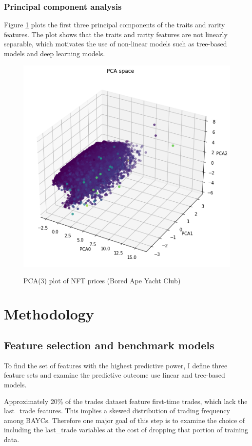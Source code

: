 \documentclass[12pt]{article}
\begin{document}
\subsubsection{Principal component analysis}
Figure \ref{fig: pca} plots the first three principal components of the traits and rarity features. The plot shows that the traits and rarity features are not linearly separable, which motivates the use of non-linear models such as tree-based models and deep learning models.   
\begin{figure}[H]
    \caption{PCA(3) plot of NFT prices (Bored Ape Yacht Club)}
    \includegraphics[width=\textwidth]{../figures/pca_1.png}
    \label{fig: pca}
\end{figure}

\section{Methodology}
\label{sec: method}
\subsection{Feature selection and benchmark models}
To find the set of features with the highest predictive power, I define three feature sets and examine the predictive outcome use linear and tree-based models.

Approximately 20\% of the trades dataset feature first-time trades, which lack the last\_trade features. This implies a skewed distribution of trading frequency among BAYCs. Therefore one major goal of this step is to examine the choice of including the last\_trade variables at the cost of dropping that portion of training data. 
\end{document}
